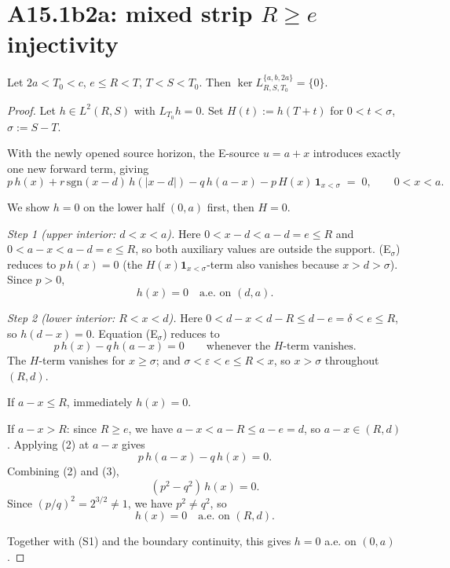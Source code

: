 \section{A15.1b2a: mixed strip $R \ge e$ injectivity}
\label{sec:p12-b2a}

\begin{theorem}\label{thm:p12-b2a}
Let $2a < T_0 < c$, $e \le R < T$, $T < S < T_0$.  Then
\(\ker L_{R,S,T_0}^{\{a,b,2a\}} = \{0\}\).
\end{theorem}

\begin{proof}
Let $h \in L^2(R, S)$ with $L_{T_0} h = 0$.  Set $H(t) := h(T + t)$ for
$0 < t < \sigma$, $\sigma := S - T$.

With the newly opened source horizon, the E-source $u = a + x$
introduces exactly one new forward term, giving
\[
p\, h(x) + r\, \mathrm{sgn}(x - d)\, h(|x - d|) - q\, h(a - x) - p\, H(x)\,\mathbf 1_{x < \sigma}
\;=\; 0,
\qquad 0 < x < a.
\tag{E$_\sigma$}
\]

We show $h = 0$ on the lower half $(0, a)$ first, then $H = 0$.

\medskip
\noindent\emph{Step 1 (upper interior: $d < x < a$).}
Here $0 < x - d < a - d = e \le R$ and $0 < a - x < a - d = e \le R$, so
both auxiliary values are outside the support.  (E$_\sigma$) reduces to
$p\, h(x) = 0$ (the $H(x)\mathbf 1_{x<\sigma}$-term also vanishes because
$x > d > \sigma$).  Since $p > 0$,
\[
h(x) = 0 \quad\text{a.e. on }(d, a).
\tag{S1}
\]

\medskip
\noindent\emph{Step 2 (lower interior: $R < x < d$).}
Here $0 < d - x < d - R \le d - e = \delta < e \le R$, so
$h(d - x) = 0$.  Equation (E$_\sigma$) reduces to
\[
p\, h(x) - q\, h(a - x) = 0
\qquad\text{whenever the $H$-term vanishes.}
\tag{2}
\]
The $H$-term vanishes for $x \ge \sigma$; and $\sigma < \varepsilon < e
\le R < x$, so $x > \sigma$ throughout $(R, d)$.

If $a - x \le R$, immediately $h(x) = 0$.

If $a - x > R$: since $R \ge e$, we have $a - x < a - R \le a - e = d$, so
$a - x \in (R, d)$.  Applying (2) at $a - x$ gives
\[
p\, h(a - x) - q\, h(x) = 0.
\tag{3}
\]
Combining (2) and (3),
\[
(p^2 - q^2)\, h(x) = 0.
\]
Since $(p/q)^2 = 2^{3/2} \ne 1$, we have $p^2 \ne q^2$, so
\[
h(x) = 0 \quad\text{a.e. on }(R, d).
\tag{S2}
\]

Together with (S1) and the boundary continuity, this gives
\(h = 0\) a.e. on $(0, a)$.


\end{proof}
